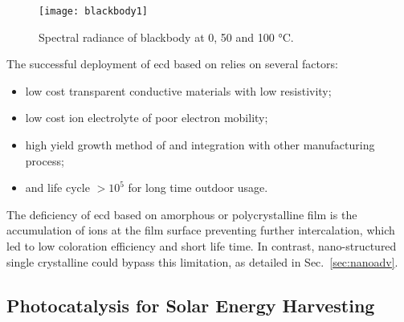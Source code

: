 \begin{figure}[htb]
\centering
\texttt{[image: blackbody1]}
\caption{Spectral radiance of blackbody at 0, 50 and 100 \si{\degreeCelsius}.}
\label{fig:introbb}
\end{figure}

The successful deployment of \gls{ecd} based on  relies on several factors:\cite{Granqvist2000}
\begin{itemize}
\item low cost transparent conductive materials with low resistivity;
\item low cost ion electrolyte of poor electron mobility;
\item high yield growth method of  and integration with other manufacturing process;
\item and life cycle $> 10^5$ for long time outdoor usage.
\end{itemize}
The deficiency of \gls{ecd} based on amorphous or polycrystalline  film is the accumulation of ions at the film surface preventing further intercalation,\cite{Dini1996} which led to low coloration efficiency and short life time. In contrast, nano-structured single crystalline  could bypass this limitation, as detailed in Sec.~\ref{sec:nanoadv}.

\subsection{Photocatalysis for Solar Energy Harvesting}


